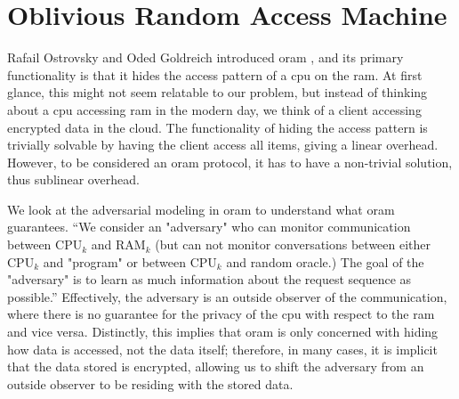 \section{Oblivious Random Access Machine}
\label{sec:oram}

Rafail Ostrovsky and Oded Goldreich introduced \acrshort{oram} \cite{STOC:Goldreich87, STOC:Ostrovsky90, GolOst96}, and its primary functionality is that it hides the access pattern of a \acrshort{cpu} on the \acrshort{ram}. At first glance, this might not seem relatable to our problem, but instead of thinking about a \acrshort{cpu} accessing \acrshort{ram} in the modern day, we think of a client accessing encrypted data in the cloud. The functionality of hiding the access pattern is trivially solvable by having the client access all items, giving a linear overhead. However, to be considered an \acrshort{oram} protocol, it has to have a non-trivial solution, thus sublinear overhead.

We look at the adversarial modeling in \acrshort{oram} to understand what \acrshort{oram} guarantees. ``We consider an "adversary" who can monitor communication between $\text{CPU}_k$ and $\text{RAM}_k$ (but can not monitor conversations between either $\text{CPU}_k$ and "program" or between $\text{CPU}_k$ and random oracle.) The goal of the "adversary" is to learn as much information about the request sequence as
possible.'' \cite{STOC:Ostrovsky90} Effectively, the adversary is an outside observer of the communication, where there is no guarantee for the privacy of the \acrshort{cpu} with respect to the \acrshort{ram} and vice versa. Distinctly, this implies that \acrshort{oram} is only concerned with hiding how data is accessed, not the data itself; therefore, in many cases, it is implicit that the data stored is encrypted, allowing us to shift the adversary from an outside observer to be residing with the stored data. 

